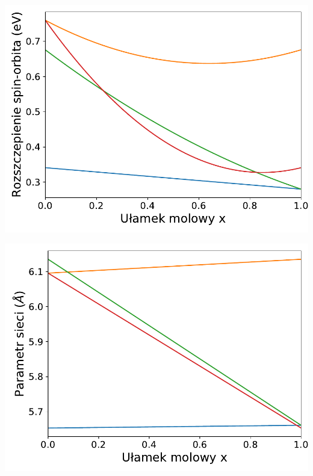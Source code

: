 \documentclass[12pt,openany,a4paper]{book}
\begin{document}
\begin{minipage}[t]{0.5\textwidth}
	\includegraphics[width = \linewidth]{Figures/ternary/delta_so.pdf}\label{fig:ter_delta_so}
\end{minipage}
\begin{minipage}[t]{0.5\textwidth}
	\includegraphics[width = \linewidth]{Figures/ternary/alc.pdf}\label{fig:ter_alc}
\end{minipage}
\end{document}
